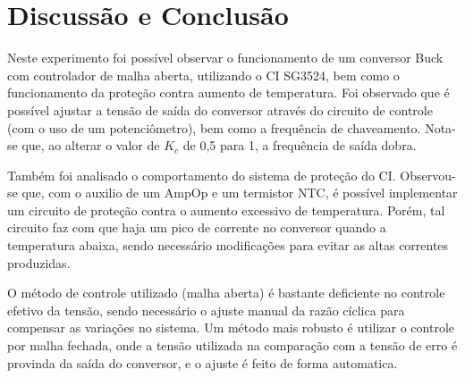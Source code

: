 \newpage
\section{Discussão e Conclusão}
Neste experimento foi possível observar o funcionamento de um conversor Buck com controlador de malha aberta, utilizando o CI SG3524, bem como o funcionamento da proteção contra aumento de temperatura.
Foi observado que é possível ajustar a tensão de saída do conversor através do circuito de controle (com o uso de um potenciômetro), bem como a frequência de chaveamento. Nota-se que, ao alterar o valor de $K_c$ de 0,5 para 1, a frequência de saída dobra.

Também foi analisado o comportamento do sistema de proteção do CI. Observou-se que, com o auxilio de um AmpOp e um termistor NTC, é possível implementar um circuito de proteção contra o aumento excessivo de temperatura. Porém, tal circuito faz com que haja um pico de corrente no conversor quando a temperatura abaixa, sendo necessário modificações para evitar as altas correntes produzidas.

O método de controle utilizado (malha aberta) é bastante deficiente no controle efetivo da tensão, sendo necessário o ajuste manual da razão cíclica para compensar as variações no sistema. Um método mais robusto é utilizar o controle por malha fechada, onde a tensão utilizada na comparação com a tensão de erro é provinda da saída do conversor, e o ajuste é feito de forma automatica.
